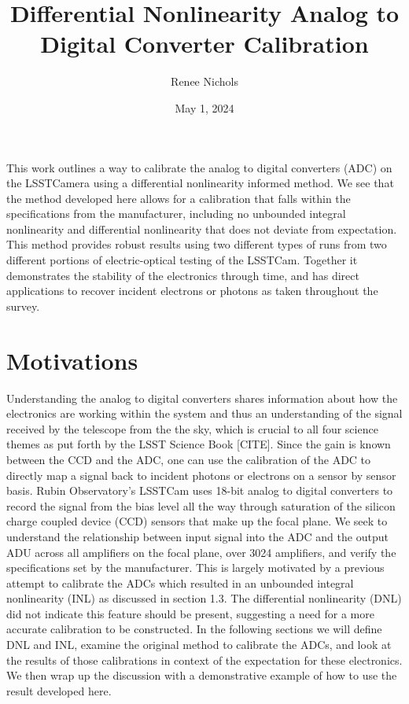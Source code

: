 \documentclass[11pt, letterpaper]{article}
\title{Differential Nonlinearity Analog to Digital Converter Calibration}
\author{Renee Nichols}
\date{May 1, 2024}
\begin{document}
\maketitle 

This work outlines a way to calibrate the analog to digital converters (ADC) on the LSSTCamera using a differential nonlinearity informed method. 
We see that the method developed here allows for a calibration that falls within the specifications from the manufacturer, including no unbounded integral nonlinearity and differential nonlinearity that does not deviate from expectation. 
This method provides robust results using two different types of runs from two different portions of electric-optical testing of the LSSTCam. 
Together it demonstrates the stability of the electronics through time, and has direct applications to recover incident electrons or photons as taken throughout the survey. 

\section{Motivations}
\indent

 
Understanding the analog to digital converters shares information about how the electronics are working within the system and thus an understanding of the signal received by the telescope from the the sky, which is crucial to all four science themes as put forth by the LSST Science Book [CITE]. 
Since the gain is known between the CCD and the ADC, one can use the calibration of the ADC to directly map a signal back to incident photons or electrons on a sensor by sensor basis.
Rubin Observatory’s LSSTCam uses 18-bit analog to digital converters to record the signal from the bias level all the way through saturation of the silicon charge coupled device (CCD) sensors that make up the focal plane. 
We seek to understand the relationship between input signal into the ADC and the output ADU across all amplifiers on the focal plane, over 3024 amplifiers, and verify the specifications set by the manufacturer. 
This is largely motivated by a previous attempt to calibrate the ADCs which resulted in an unbounded integral nonlinearity (INL) as discussed in section 1.3. 
The differential nonlinearity (DNL) did not indicate this feature should be present, suggesting a need for a more accurate calibration to be constructed. 
In the following sections we will define DNL and INL, examine the original method to calibrate the ADCs, and look at the results of those calibrations in context of the expectation for these electronics. 
We then wrap up the discussion with a demonstrative example of how to use the result developed here. 
\end{document}
